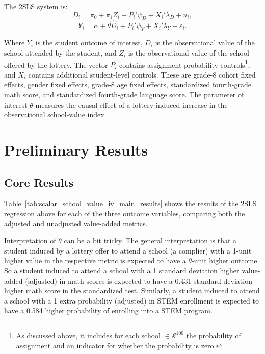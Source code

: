 \documentclass[a4paper, article, english, oneside, unknownkeysallowed, 12pt]{memoir}
\begin{document}
The 2SLS system is:
\[
D_i
=
\pi_0
+
\pi_1 Z_i
+
P_i'\psi_D
+
X_i'\lambda_D
+
u_i ,
\]
\[
Y_i
=
\alpha
+
\theta \widehat{D}_i
+
P_i'\psi_Y
+
X_i'\lambda_Y
+
\varepsilon_i .
\]

Where \(Y_i\) is the student outcome of interest, \(D_i\) is the observational value of the school attended by the student, and \(Z_i\) is the observational value of the school offered by the lottery. 
The vector \(P_i\) contains assignment-probability controls\footnote{As discussed above, it includes for each school $\in \mathcal{S}^{100}$ the probability of assignment and an indicator for whether the probability is zero.}, and \(X_i\) contains additional student-level controls. 
These are grade-8 cohort fixed effects, gender fixed effects, grade-8 age fixed effects, standardized fourth-grade math score, and standardized fourth-grade language score.
 The parameter of interest  \(\theta\) measures the causal effect of a lottery-induced increase in the observational school-value index.



\section{Preliminary Results}
  \subsection{Core Results}



Table~\ref{tab:scalar_school_value_iv_main_results} shows the results of the 2SLS regression above for each of the three outcome variables, comparing both the adjusted and unadjusted value-added metrics.

Interpretation of $\theta$ can be a bit tricky. The general interpretation is that a student induced by a lottery offer to attend a school (a complier) with a 1-unit higher value in the respective metric is expected to have a $\theta$-unit higher outcome.
So a student induced to attend a school with a 1 standard deviation higher value-added (adjusted) in math scores is expected to have a 0.431 standard deviation higher math score in the standardized test. 
Similarly, a student induced to attend a school with a 1 extra probability (adjusted) in STEM enrollment is expected to have a 0.584 higher probability of enrolling into a STEM program.
\end{document}

